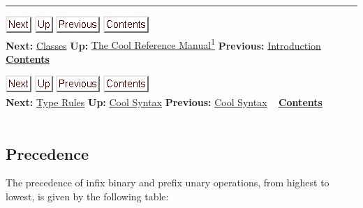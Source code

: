 \documentclass[]{article}
\begin{document}
\begin{center}\rule{3in}{0.4pt}\end{center}

\href{node4.html}{\includegraphics{next.png}}
\href{cool-manual.html}{\includegraphics{up.png}}
\href{node2.html}{\includegraphics{prev.png}}
\href{node1.html}{\includegraphics{contents.png}} \\ \textbf{Next:}
\href{node4.html}{Classes} \textbf{Up:} \href{cool-manual.html}{The Cool
Reference Manual\textsuperscript{1}} \textbf{Previous:}
\href{node2.html}{Introduction} ~ \textbf{\href{node1.html}{Contents}}

\href{node41.html}{\includegraphics{next.png}}
\href{node39.html}{\includegraphics{up.png}}
\href{node39.html}{\includegraphics{prev.png}}
\href{node1.html}{\includegraphics{contents.png}} \\ \textbf{Next:}
\href{node41.html}{Type Rules} \textbf{Up:} \href{node39.html}{Cool
Syntax} \textbf{Previous:} \href{node39.html}{Cool Syntax} ~
\textbf{\href{node1.html}{Contents}} \\ \\

\subsection{Precedence}

The precedence of infix binary and prefix unary operations, from highest
to lowest, is given by the following table:
\end{document}
